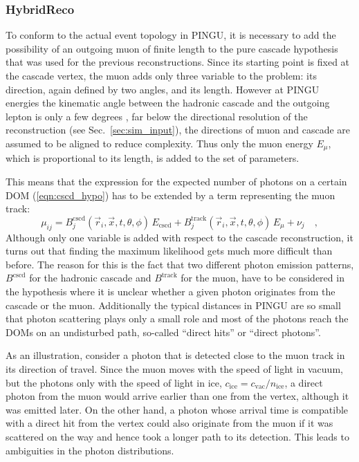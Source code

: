 \subsubsection{HybridReco}

To conform to the actual event topology in PINGU, it is necessary to add the
possibility of an outgoing muon of finite length to the pure cascade hypothesis
that was used for the previous reconstructions. Since its starting point is
fixed at the cascade vertex, the muon adds only three variable to the problem:
its direction, again defined by two angles, and its length. However at PINGU
energies the kinematic angle between the hadronic cascade and the outgoing
lepton is only a few degrees \cite{NuScattAng}, far below the directional
resolution of the reconstruction (see Sec.~\ref{sec:sim_input}), the directions
of muon and cascade are assumed to be aligned to reduce complexity. Thus only
the muon energy $E_\mu$, which is proportional to its length, is added to the
set of parameters.

This means that the expression for the expected number of photons on a certain
DOM (\ref{eqn:cscd_hypo}) has to be extended by a term representing the muon
track:
\begin{equation}
  \mu_{ij} = B^\mathrm{cscd}_j(\vec{r}_i, \vec{x}, t, \theta,\phi)
              \,E_\mathrm{cscd}
   + B^\mathrm{track}_j(\vec{r}_i, \vec{x}, t, \theta, \phi)\,E_\mu
   + \nu_j \quad, \label{eqn:hybrid_hypo}
\end{equation}
Although only one variable is added with respect to the cascade reconstruction,
it turns out that finding the maximum likelihood gets much more difficult than
before. The reason for this is the fact that two different photon emission
patterns, $B^\mathrm{cscd}$ for the hadronic cascade and $B^\mathrm{track}$ for
the muon, have to be considered in the hypothesis where it is unclear whether a
given photon originates from the cascade or the muon. Additionally the typical
distances in PINGU are so small that photon scattering plays only a small role
and most of the photons reach the DOMs on an undisturbed path, so-called
``direct hits'' or ``direct photons''.

As an illustration, consider a photon that is detected close to the muon track
in its direction of travel. Since the muon moves with the speed of light in
vacuum, but the photons only with the speed of light in ice, $c_\mathrm{ice} =
c_\mathrm{vac}/n_\mathrm{ice}$, a direct photon from the muon would arrive
earlier than one from the vertex, although it was emitted later. On the other
hand, a photon whose arrival time is compatible with a direct hit from the
vertex could also originate from the muon if it was scattered on the way and
hence took a longer path to its detection. This leads to ambiguities in the
photon distributions.

